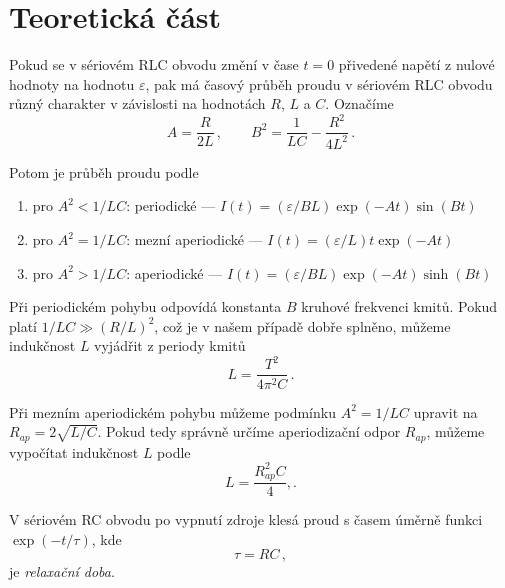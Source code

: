 \section*{Teoretická část}
Pokud se v sériovém RLC obvodu změní v čase $t=0$ přivedené napětí z nulové hodnoty na hodnotu $\varepsilon$, pak má časový průběh proudu v sériovém RLC obvodu různý charakter v závislosti na hodnotách $R$, $L$ a $C$.
Označíme
\begin{equation*}
A=\frac{R}{2L} \,, \qquad  B^2=\frac{1}{LC} - \frac{R^2}{4L^2} \,.
\end{equation*}

Potom je průběh proudu podle \cite{skripta}
\begin{enumerate}
\item pro $A^2<1/LC$: periodické --- $I(t) = (\varepsilon/BL) \exp(-At) \sin(Bt)$
\item pro $A^2=1/LC$: mezní aperiodické --- $I(t) = (\varepsilon/L)t \exp(-At)$
\item pro $A^2>1/LC$: aperiodické --- $I(t) = (\varepsilon/BL) \exp(-At) \sinh(Bt)$
\end{enumerate}

Při periodickém pohybu odpovídá konstanta $B$ kruhové frekvenci kmitů.
Pokud platí $1/LC \gg (R/L)^2$, což je v našem případě dobře splněno, můžeme indukčnost $L$ vyjádřit z periody kmitů
\begin{equation} \label{e:Lper}
L=\frac{T^2}{4\pi^2 C} \,.
\end{equation}

Při mezním aperiodickém pohybu můžeme podmínku $A^2=1/LC$ upravit na $R_{ap}=2 \sqrt{L/C}$.
Pokud tedy správně určíme aperiodizační odpor $R_{ap}$, můžeme vypočítat indukčnost $L$ podle
\begin{equation} \label{e:Laper}
L=\frac{R_{ap}^2C}{4} 	,.
\end{equation}

V sériovém RC obvodu po vypnutí zdroje klesá proud s časem úměrně funkci $\exp(-t/\tau)$, kde
\begin{equation} \label{e:tau}
\tau=RC \,,
\end{equation}
je \emph{relaxační doba}.